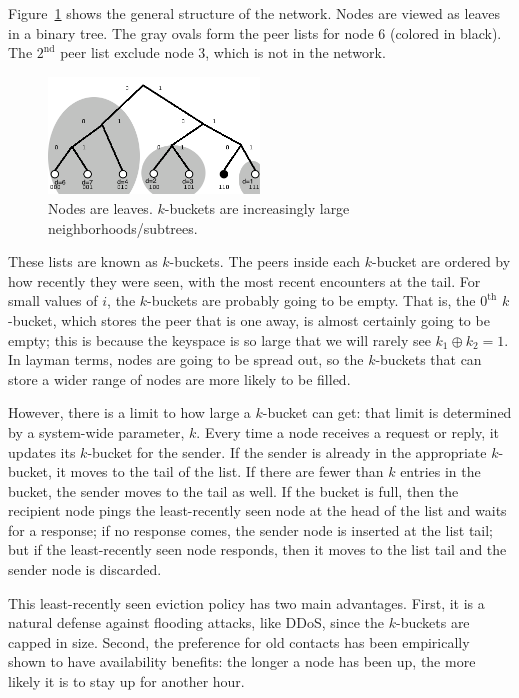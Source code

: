 \documentclass[12pt,twocolumn]{article}
\begin{document}
Figure~\ref{tree} shows the general structure of the network. Nodes are viewed as leaves in a binary tree. The gray ovals form the peer lists for node 6 (colored in black). The $2^{\mathrm{nd}}$ peer list exclude node 3, which is not in the network.

\begin{figure}[h!]
  \centering
  \includegraphics[width=0.5\textwidth]{images/tree}
  \caption{\label{tree}Nodes are leaves. $k$-buckets are increasingly large neighborhoods/subtrees.}
\end{figure}

These lists are known as $k$-buckets.
The peers inside each $k$-bucket are ordered by how recently they were seen, with the most recent encounters at the tail.
For small values of $i$, the $k$-buckets are probably going to be empty.
That is, the $0^{\mathrm{th}}$ $k$-bucket, which stores the peer that is one away, is almost certainly going to be empty; this is because the keyspace is so large that we will rarely see $k_1 \oplus k_2 = 1$.
In layman terms, nodes are going to be spread out, so the $k$-buckets that can store a wider range of nodes are more likely to be filled.

However, there is a limit to how large a $k$-bucket can get: that limit is determined by a system-wide parameter, $k$. Every time a node receives a request or reply, it updates its $k$-bucket for the sender. If the sender is already in the appropriate $k$-bucket, it moves to the tail of the list. If there are fewer than $k$ entries in the bucket, the sender moves to the tail as well. If the bucket is full, then the recipient node pings the least-recently seen node at the head of the list and waits for a response; if no response comes, the sender node is inserted at the list tail; but if the least-recently seen node responds, then it moves to the list tail and the sender node is discarded.

This least-recently seen eviction policy has two main advantages. First, it is a natural defense against flooding attacks, like DDoS, since the $k$-buckets are capped in size. Second, the preference for old contacts has been empirically shown to have availability benefits: the longer a node has been up, the more likely it is to stay up for another hour.
\end{document}
